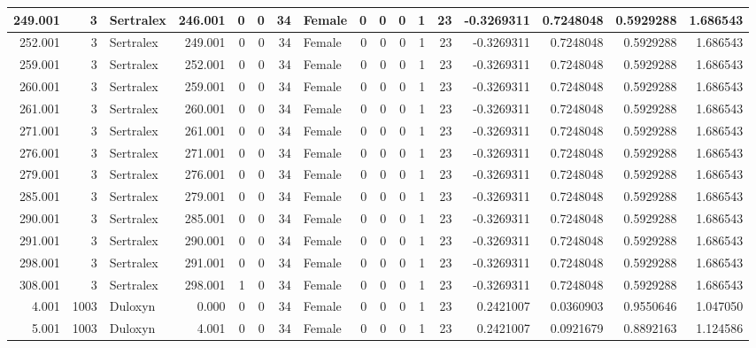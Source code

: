 \documentclass[
]{book}
\begin{document}
\begin{table}
\begin{tabular}[t]{r|r|l|r|r|r|r|l|r|r|r|r|r|r|r|r|r}
\hline
249.001 & 3 & Sertralex & 246.001 & 0 & 0 & 34 & Female & 0 & 0 & 0 & 1 & 23 & -0.3269311 & 0.7248048 & 0.5929288 & 1.686543\\
\hline
252.001 & 3 & Sertralex & 249.001 & 0 & 0 & 34 & Female & 0 & 0 & 0 & 1 & 23 & -0.3269311 & 0.7248048 & 0.5929288 & 1.686543\\
\hline
259.001 & 3 & Sertralex & 252.001 & 0 & 0 & 34 & Female & 0 & 0 & 0 & 1 & 23 & -0.3269311 & 0.7248048 & 0.5929288 & 1.686543\\
\hline
260.001 & 3 & Sertralex & 259.001 & 0 & 0 & 34 & Female & 0 & 0 & 0 & 1 & 23 & -0.3269311 & 0.7248048 & 0.5929288 & 1.686543\\
\hline
261.001 & 3 & Sertralex & 260.001 & 0 & 0 & 34 & Female & 0 & 0 & 0 & 1 & 23 & -0.3269311 & 0.7248048 & 0.5929288 & 1.686543\\
\hline
271.001 & 3 & Sertralex & 261.001 & 0 & 0 & 34 & Female & 0 & 0 & 0 & 1 & 23 & -0.3269311 & 0.7248048 & 0.5929288 & 1.686543\\
\hline
276.001 & 3 & Sertralex & 271.001 & 0 & 0 & 34 & Female & 0 & 0 & 0 & 1 & 23 & -0.3269311 & 0.7248048 & 0.5929288 & 1.686543\\
\hline
279.001 & 3 & Sertralex & 276.001 & 0 & 0 & 34 & Female & 0 & 0 & 0 & 1 & 23 & -0.3269311 & 0.7248048 & 0.5929288 & 1.686543\\
\hline
285.001 & 3 & Sertralex & 279.001 & 0 & 0 & 34 & Female & 0 & 0 & 0 & 1 & 23 & -0.3269311 & 0.7248048 & 0.5929288 & 1.686543\\
\hline
290.001 & 3 & Sertralex & 285.001 & 0 & 0 & 34 & Female & 0 & 0 & 0 & 1 & 23 & -0.3269311 & 0.7248048 & 0.5929288 & 1.686543\\
\hline
291.001 & 3 & Sertralex & 290.001 & 0 & 0 & 34 & Female & 0 & 0 & 0 & 1 & 23 & -0.3269311 & 0.7248048 & 0.5929288 & 1.686543\\
\hline
298.001 & 3 & Sertralex & 291.001 & 0 & 0 & 34 & Female & 0 & 0 & 0 & 1 & 23 & -0.3269311 & 0.7248048 & 0.5929288 & 1.686543\\
\hline
308.001 & 3 & Sertralex & 298.001 & 1 & 0 & 34 & Female & 0 & 0 & 0 & 1 & 23 & -0.3269311 & 0.7248048 & 0.5929288 & 1.686543\\
\hline
4.001 & 1003 & Duloxyn & 0.000 & 0 & 0 & 34 & Female & 0 & 0 & 0 & 1 & 23 & 0.2421007 & 0.0360903 & 0.9550646 & 1.047050\\
\hline
5.001 & 1003 & Duloxyn & 4.001 & 0 & 0 & 34 & Female & 0 & 0 & 0 & 1 & 23 & 0.2421007 & 0.0921679 & 0.8892163 & 1.124586\\

\end{tabular}
\end{table}
\end{document}
